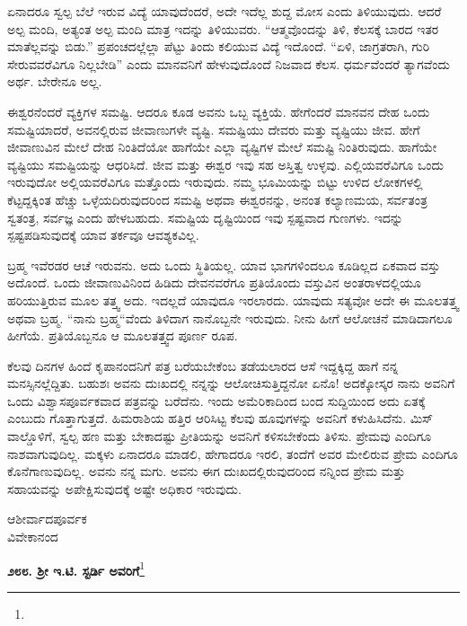ಏನಾದರೂ ಸ್ವಲ್ಪ ಬೆಲೆ ಇರುವ ವಿದ್ಯೆ ಯಾವುದೆಂದರೆ, ಅದೇ ಇದೆಲ್ಲ ಶುದ್ದ ಮೋಸ ಎಂದು ತಿಳಿಯುವುದು. ಆದರೆ ಅಲ್ಪ ಮಂದಿ, ಅತ್ಯಂತ ಅಲ್ಪ ಮಂದಿ ಮಾತ್ರ ಇದನ್ನು ತಿಳಿಯುವರು. “ಆತ್ಮವೊಂದನ್ನು ತಿಳಿ, ಕೆಲಸಕ್ಕೆ ಬಾರದ ಇತರ ಮಾತೆಲ್ಲವನ್ನು ಬಿಡು.” ಪ್ರಪಂಚದಲ್ಲೆಲ್ಲಾ ಪೆಟ್ಟು ತಿಂದು ಕಲಿಯುವ ವಿದ್ಯೆ ಇದೊಂದೆ. “ಏಳಿ, ಜಾಗ್ರತರಾಗಿ, ಗುರಿ ಸೇರುವವರೆವಿಗೂ ನಿಲ್ಲಬೇಡಿ” ಎಂದು ಮಾನವನಿಗೆ ಹೇಳುವುದೊಂದೆ ನಿಜವಾದ ಕೆಲಸ. ಧರ್ಮವೆಂದರೆ ತ್ಯಾಗವೆಂದು ಅರ್ಥ. ಬೇರೇನೂ ಅಲ್ಲ.
\vspace{0.2cm}

ಈಶ್ವರನೆಂದರೆ ವ್ಯಕ್ತಿಗಳ ಸಮಷ್ಟಿ. ಆದರೂ ಕೂಡ ಅವನು ಒಬ್ಬ ವ್ಯಕ್ತಿಯೆ. ಹೇಗೆಂದರೆ ಮಾನವನ ದೇಹ ಒಂದು ಸಮಷ್ಟಿಯಾದರೆ, ಅವನಲ್ಲಿರುವ ಜೀವಾಣುಗಳೇ  ವ್ಯಷ್ಟಿ. ಸಮಷ್ಟಿಯು ದೇವರು ಮತ್ತು ವ್ಯಷ್ಟಿಯು ಜೀವ. ಹೇಗೆ ಜೀವಾಣುವಿನ  ಮೇಲೆ ದೇಹ ನಿಂತಿದೆಯೋ ಹಾಗೆಯೇ ಎಲ್ಲಾ ವ್ಯಷ್ಟಿಗಳ ಮೇಲೆ ಸಮಷ್ಟಿ ನಿಂತಿರುವುದು. ಹಾಗೆಯೇ ವ್ಯಷ್ಟಿಯು ಸಮಷ್ಟಿಯನ್ನು ಆಧರಿಸಿದೆ. ಜೀವ ಮತ್ತು ಈಶ್ವರ ಇವು ಸಹ ಅಸ್ತಿತ್ವ ಉಳ್ಳವು. ಎಲ್ಲಿಯವರೆವಿಗೂ ಒಂದು ಇರುವುದೋ ಅಲ್ಲಿಯವರೆವಿಗೂ ಮತ್ತೊಂದು ಇರುವುದು. ನಮ್ಮ ಭೂಮಿಯನ್ನು ಬಿಟ್ಟು ಉಳಿದ ಲೋಕಗಳಲ್ಲಿ ಕೆಟ್ಟದ್ದಕ್ಕಿಂತ ಹೆಚ್ಚು ಒಳ್ಳೆಯದಿರುವುದರಿಂದ ಸಮಷ್ಟಿ ಅಥವಾ ಈಶ್ವರನನ್ನು, ಅನಂತ ಕಲ್ಯಾಣಮಯ, ಸರ್ವತಂತ್ರ ಸ್ವತಂತ್ರ, ಸರ್ವಜ್ಞ ಎಂದು ಹೇಳಬಹುದು. ಸಮಷ್ಟಿಯ ದೃಷ್ಟಿಯಿಂದ ಇವು ಸ್ಪಷ್ಟವಾದ ಗುಣಗಳು. ಇದನ್ನು ಸ್ಪಷ್ಟಪಡಿಸುವುದಕ್ಕೆ ಯಾವ ತರ್ಕವೂ ಆವಶ್ಯಕವಿಲ್ಲ.
\vspace{0.2cm}

ಬ್ರಹ್ಮ ಇವೆರಡರ ಆಚೆ ಇರುವನು. ಅದು ಒಂದು ಸ್ಥಿತಿಯಲ್ಲ. ಯಾವ ಭಾಗಗಳಿಂದಲೂ ಕೂಡಿಲ್ಲದ ಏಕವಾದ ವಸ್ತು ಅದೊಂದೆ. ಒಂದು ಜೀವಾಣುವಿನಿಂದ ಹಿಡಿದು ದೇವನವರೆಗೂ ಪ್ರತಿಯೊಂದು ವಸ್ತುವಿನ ಅಂತರಾಳದಲ್ಲಿಯೂ ಹರಿಯುತ್ತಿರುವ ಮೂಲ ತತ್ತ್ವ ಅದು. ಇದಲ್ಲದೆ ಯಾವುದೂ ಇರಲಾರದು. ಯಾವುದು ಸತ್ಯವೋ ಅದೇ ಈ ಮೂಲತತ್ತ್ವ ಅಥವಾ ಬ್ರಹ್ಮ. “ನಾನು ಬ್ರಹ್ಮ“ವೆಂದು ತಿಳಿದಾಗ ನಾನೊಬ್ಬನೇ ಇರುವುದು. ನೀನು ಹೀಗೆ ಆಲೋಚನೆ ಮಾಡಿದಾಗಲೂ ಹೀಗೆಯೆ. ಪ್ರತಿಯೊಬ್ಬನೂ ಆ ಮೂಲತತ್ತ್ವದ ಪೂರ್ಣ ರೂಪ.
\vspace{0.2cm}

ಕೆಲವು ದಿನಗಳ ಹಿಂದೆ ಕೃಪಾನಂದನಿಗೆ ಪತ್ರ ಬರೆಯಬೇಕೆಂಬ ತಡೆಯಲಾರದ ಆಸೆ ಇದ್ದಕ್ಕಿದ್ದ ಹಾಗೆ ನನ್ನ ಮನಸ್ಸಿನಲ್ಲೆದ್ದಿತು. ಬಹುಶಃ ಅವನು ದುಃಖದಲ್ಲಿ ನನ್ನನ್ನು ಆಲೋಚಿಸುತ್ತಿದ್ದನೋ ಏನೊ! ಅದಕ್ಕೋಸ್ಕರ ನಾನು ಅವನಿಗೆ ಒಂದು ವಿಶ್ವಾಸಪೂರ್ವಕವಾದ ಪತ್ರವನ್ನು ಬರೆದೆನು. ಇಂದು ಅಮೆರಿಕಾದಿಂದ ಬಂದ ಸುದ್ದಿಯಿಂದ ಅದು ಏತಕ್ಕೆ ಎಂಬುದು ಗೊತ್ತಾಗುತ್ತದೆ. ಹಿಮರಾಶಿಯ ಹತ್ತಿರ ಆರಿಸಿಟ್ಟ ಕೆಲವು ಹೂವುಗಳನ್ನು ಅವನಿಗೆ ಕಳುಹಿಸಿದೆನು. ಮಿಸ್ ವಾಲ್ಡೊಳಿಗೆ, ಸ್ವಲ್ಪ ಹಣ ಮತ್ತು ಬೇಕಾದಷ್ಟು ಪ್ರೀತಿಯನ್ನು ಅವನಿಗೆ ಕಳಿಸಬೇಕೆಂದು ತಿಳಿಸು. ಪ್ರೇಮವು ಎಂದಿಗೂ ನಾಶವಾಗುವುದಿಲ್ಲ. ಮಕ್ಕಳು ಏನಾದರೂ ಮಾಡಲಿ, ಹೇಗಾದರೂ ಇರಲಿ, ತಂದೆಗೆ ಅವರ ಮೇಲಿರುವ ಪ್ರೇಮ ಎಂದಿಗೂ ಕೊನೆಗಾಣುವುದಿಲ್ಲ. ಅವನು ನನ್ನ ಮಗು. ಅವನು ಈಗ ದುಃಖದಲ್ಲಿರುವುದರಿಂದ ನನ್ನಿಂದ ಪ್ರೇಮ ಮತ್ತು ಸಹಾಯವನ್ನು ಅಪೇಕ್ಷಿಸುವುದಕ್ಕೆ ಅಷ್ಟೇ ಅಧಿಕಾರ ಇರುವುದು.

{\flushright
ಆಶೀರ್ವಾದಪೂರ್ವಕ\\ವಿವೇಕಾನಂದ\par}

\begin{center}
\textbf{೨೮೮. ಶ‍್ರೀ ಇ.ಟಿ. ಸ್ಟರ್ಡಿ ಅವರಿಗೆ}\footnote{}
\end{center}

